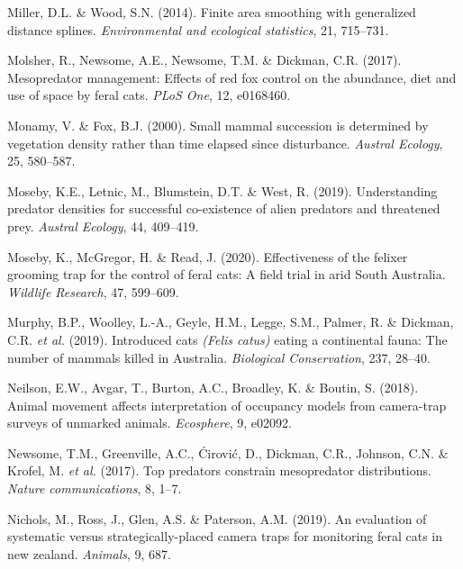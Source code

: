 \documentclass[11pt,a4paper,titlepage,twoside,openright]{style/unimelbthesis}
\begin{document}
\begin{mainmatter}
\leavevmode\hypertarget{ref-miller2014finite}{}%
Miller, D.L. \& Wood, S.N. (2014). Finite area smoothing with generalized distance splines. \emph{Environmental and ecological statistics}, 21, 715--731.

\leavevmode\hypertarget{ref-molsher2017mesopredator}{}%
Molsher, R., Newsome, A.E., Newsome, T.M. \& Dickman, C.R. (2017). Mesopredator management: Effects of red fox control on the abundance, diet and use of space by feral cats. \emph{PLoS One}, 12, e0168460.

\leavevmode\hypertarget{ref-monamy2000small}{}%
Monamy, V. \& Fox, B.J. (2000). Small mammal succession is determined by vegetation density rather than time elapsed since disturbance. \emph{Austral Ecology}, 25, 580--587.

\leavevmode\hypertarget{ref-moseby2019understanding}{}%
Moseby, K.E., Letnic, M., Blumstein, D.T. \& West, R. (2019). Understanding predator densities for successful co-existence of alien predators and threatened prey. \emph{Austral Ecology}, 44, 409--419.

\leavevmode\hypertarget{ref-moseby2020effectiveness}{}%
Moseby, K., McGregor, H. \& Read, J. (2020). Effectiveness of the felixer grooming trap for the control of feral cats: A field trial in arid South Australia. \emph{Wildlife Research}, 47, 599--609.

\leavevmode\hypertarget{ref-murphy2019introduced}{}%
Murphy, B.P., Woolley, L.-A., Geyle, H.M., Legge, S.M., Palmer, R. \& Dickman, C.R. \emph{et al.} (2019). Introduced cats \emph{(Felis catus)} eating a continental fauna: The number of mammals killed in Australia. \emph{Biological Conservation}, 237, 28--40.

\leavevmode\hypertarget{ref-neilson2018animal}{}%
Neilson, E.W., Avgar, T., Burton, A.C., Broadley, K. \& Boutin, S. (2018). Animal movement affects interpretation of occupancy models from camera-trap surveys of unmarked animals. \emph{Ecosphere}, 9, e02092.

\leavevmode\hypertarget{ref-newsome2017top}{}%
Newsome, T.M., Greenville, A.C., Ćirović, D., Dickman, C.R., Johnson, C.N. \& Krofel, M. \emph{et al.} (2017). Top predators constrain mesopredator distributions. \emph{Nature communications}, 8, 1--7.

\leavevmode\hypertarget{ref-nichols2019evaluation}{}%
Nichols, M., Ross, J., Glen, A.S. \& Paterson, A.M. (2019). An evaluation of systematic versus strategically-placed camera traps for monitoring feral cats in new zealand. \emph{Animals}, 9, 687.


\end{mainmatter}
\end{document}
